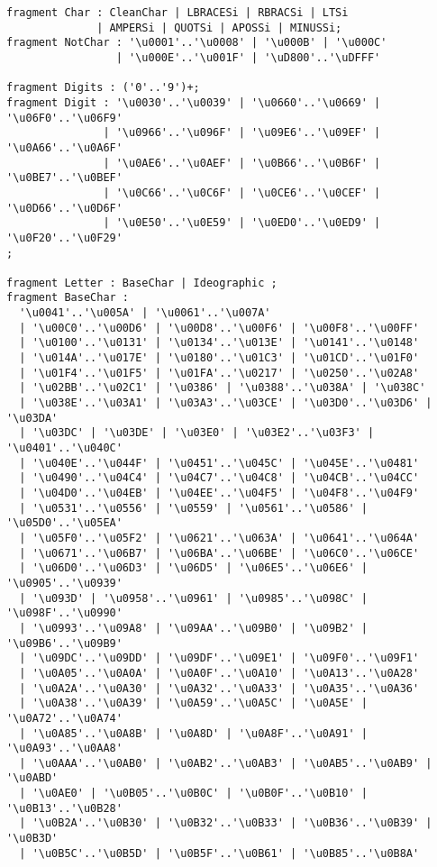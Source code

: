 \begin{Verbatim}[frame=none, fontsize=\footnotesize]
fragment Char : CleanChar | LBRACESi | RBRACSi | LTSi 
              | AMPERSi | QUOTSi | APOSSi | MINUSSi;
fragment NotChar : '\u0001'..'\u0008' | '\u000B' | '\u000C' 
                 | '\u000E'..'\u001F' | '\uD800'..'\uDFFF' 

fragment Digits : ('0'..'9')+;
fragment Digit : '\u0030'..'\u0039' | '\u0660'..'\u0669' | '\u06F0'..'\u06F9' 
               | '\u0966'..'\u096F' | '\u09E6'..'\u09EF' | '\u0A66'..'\u0A6F' 
               | '\u0AE6'..'\u0AEF' | '\u0B66'..'\u0B6F' | '\u0BE7'..'\u0BEF' 
               | '\u0C66'..'\u0C6F' | '\u0CE6'..'\u0CEF' | '\u0D66'..'\u0D6F' 
               | '\u0E50'..'\u0E59' | '\u0ED0'..'\u0ED9' | '\u0F20'..'\u0F29' 
;

fragment Letter : BaseChar | Ideographic ;
fragment BaseChar : 
  '\u0041'..'\u005A' | '\u0061'..'\u007A' 
  | '\u00C0'..'\u00D6' | '\u00D8'..'\u00F6' | '\u00F8'..'\u00FF' 
  | '\u0100'..'\u0131' | '\u0134'..'\u013E' | '\u0141'..'\u0148' 
  | '\u014A'..'\u017E' | '\u0180'..'\u01C3' | '\u01CD'..'\u01F0' 
  | '\u01F4'..'\u01F5' | '\u01FA'..'\u0217' | '\u0250'..'\u02A8' 
  | '\u02BB'..'\u02C1' | '\u0386' | '\u0388'..'\u038A' | '\u038C' 
  | '\u038E'..'\u03A1' | '\u03A3'..'\u03CE' | '\u03D0'..'\u03D6' | '\u03DA' 
  | '\u03DC' | '\u03DE' | '\u03E0' | '\u03E2'..'\u03F3' | '\u0401'..'\u040C' 
  | '\u040E'..'\u044F' | '\u0451'..'\u045C' | '\u045E'..'\u0481' 
  | '\u0490'..'\u04C4' | '\u04C7'..'\u04C8' | '\u04CB'..'\u04CC'
  | '\u04D0'..'\u04EB' | '\u04EE'..'\u04F5' | '\u04F8'..'\u04F9' 
  | '\u0531'..'\u0556' | '\u0559' | '\u0561'..'\u0586' | '\u05D0'..'\u05EA' 
  | '\u05F0'..'\u05F2' | '\u0621'..'\u063A' | '\u0641'..'\u064A' 
  | '\u0671'..'\u06B7' | '\u06BA'..'\u06BE' | '\u06C0'..'\u06CE' 
  | '\u06D0'..'\u06D3' | '\u06D5' | '\u06E5'..'\u06E6' | '\u0905'..'\u0939' 
  | '\u093D' | '\u0958'..'\u0961' | '\u0985'..'\u098C' | '\u098F'..'\u0990' 
  | '\u0993'..'\u09A8' | '\u09AA'..'\u09B0' | '\u09B2' | '\u09B6'..'\u09B9' 
  | '\u09DC'..'\u09DD' | '\u09DF'..'\u09E1' | '\u09F0'..'\u09F1' 
  | '\u0A05'..'\u0A0A' | '\u0A0F'..'\u0A10' | '\u0A13'..'\u0A28' 
  | '\u0A2A'..'\u0A30' | '\u0A32'..'\u0A33' | '\u0A35'..'\u0A36' 
  | '\u0A38'..'\u0A39' | '\u0A59'..'\u0A5C' | '\u0A5E' | '\u0A72'..'\u0A74' 
  | '\u0A85'..'\u0A8B' | '\u0A8D' | '\u0A8F'..'\u0A91' | '\u0A93'..'\u0AA8' 
  | '\u0AAA'..'\u0AB0' | '\u0AB2'..'\u0AB3' | '\u0AB5'..'\u0AB9' | '\u0ABD' 
  | '\u0AE0' | '\u0B05'..'\u0B0C' | '\u0B0F'..'\u0B10' | '\u0B13'..'\u0B28' 
  | '\u0B2A'..'\u0B30' | '\u0B32'..'\u0B33' | '\u0B36'..'\u0B39' | '\u0B3D' 
  | '\u0B5C'..'\u0B5D' | '\u0B5F'..'\u0B61' | '\u0B85'..'\u0B8A' 

\end{Verbatim}
